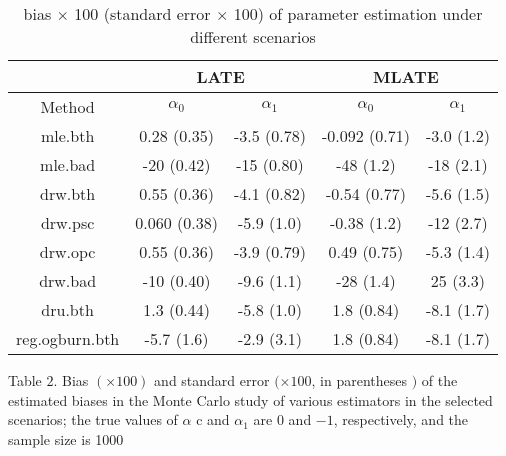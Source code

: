 \documentclass{article}
\begin{document}
\begin{table}
\footnotesize
\centering
\begin{tabular}[h]{c|cc|cc}
\toprule
    & \multicolumn{2}{c|}{LATE} &\multicolumn{2}{c}{MLATE}\\
\midrule
    Method & $\alpha_0$ & $\alpha_1$ & $\alpha_0$ & $\alpha_1$\\
\midrule
    mle.bth&0.28 (0.35) & -3.5 (0.78)&-0.092 (0.71) &-3.0 (1.2)\\
    mle.bad&-20 (0.42) & -15 (0.80)&-48 (1.2) & -18 (2.1)\\
    drw.bth&0.55 (0.36) & -4.1 (0.82)&-0.54 (0.77) & -5.6 (1.5)\\
    drw.psc&0.060 (0.38) & -5.9 (1.0)&-0.38 (1.2) & -12 (2.7)\\
    drw.opc&0.55 (0.36) & -3.9 (0.79)&0.49 (0.75) & -5.3 (1.4)\\
    drw.bad&-10 (0.40) & -9.6 (1.1)&-28 (1.4) & 25 (3.3)\\
    dru.bth&1.3 (0.44) & -5.8 (1.0)&1.8 (0.84) & -8.1 (1.7)\\
    reg.ogburn.bth&-5.7 (1.6) & -2.9 (3.1)&1.8 (0.84) & -8.1 (1.7)\\
\bottomrule
\end{tabular}
\caption{bias $\times$ 100 (standard error $\times$ 100) of parameter estimation under different scenarios}
\end{table}

Table $2 .$ Bias $(\times 100)$ and standard error $(\times 100$, in parentheses $)$ of the estimated biases in the Monte Carlo study of various estimators in the selected scenarios; the true values of $\alpha$ c and $\alpha_{1}$ are 0 and $-1$, respectively, and the sample size is 1000
\end{document}
